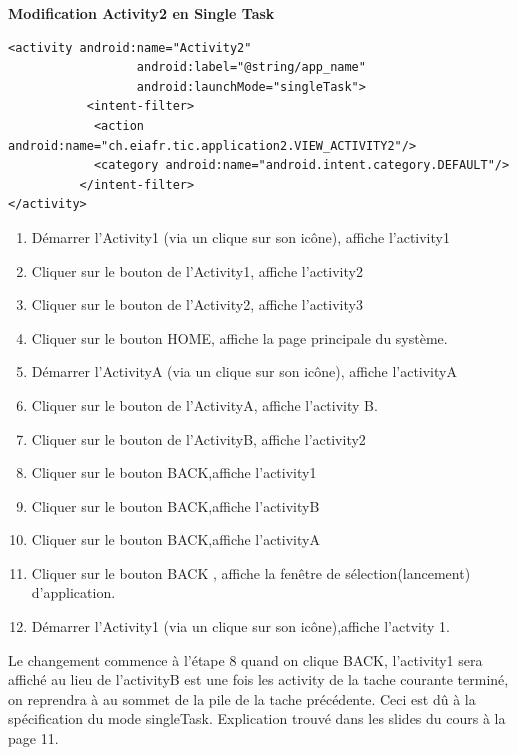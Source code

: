 \textbf{Modification Activity2 en Single Task}
\begin{lstlisting}
<activity android:name="Activity2"
                  android:label="@string/app_name"
                  android:launchMode="singleTask">
           <intent-filter>
            <action android:name="ch.eiafr.tic.application2.VIEW_ACTIVITY2"/> 
            <category android:name="android.intent.category.DEFAULT"/>
          </intent-filter> 
</activity>
\end{lstlisting}
			\begin{enumerate}
					\item Démarrer l'Activity1 (via un clique sur son icône), affiche l'activity1
					\item Cliquer sur le bouton de l’Activity1, affiche l'activity2
					\item Cliquer sur le bouton de l’Activity2, affiche l'activity3
					\item Cliquer sur le bouton HOME, affiche la page principale du système.
					\item Démarrer l'ActivityA (via un clique sur son icône), affiche l'activityA
					\item Cliquer sur le bouton de l’ActivityA, affiche l'activity B.
					\item  Cliquer sur le bouton de l’ActivityB, affiche l'activity2
					\item Cliquer sur le bouton BACK,affiche l'activity1
					\item Cliquer sur le bouton BACK,affiche l'activityB
					\item Cliquer sur le bouton BACK,affiche l'activityA
					\item Cliquer sur le bouton BACK , affiche la fenêtre de sélection(lancement) d'application.
					\item Démarrer l'Activity1 (via un clique sur son icône),affiche l'actvity 1.
			\end{enumerate}
			Le changement commence à l'étape 8 quand on clique BACK, l'activity1 sera affiché au lieu de l'activityB est une fois les activity de la tache courante terminé, on reprendra à au sommet de la pile de la tache précédente. Ceci est dû à la spécification du mode singleTask. Explication trouvé dans les slides du cours à la page 11.
			
